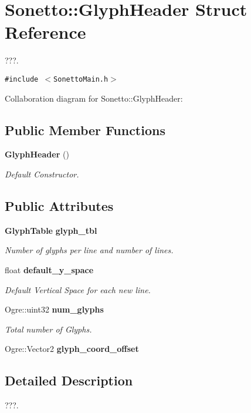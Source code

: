 \section{Sonetto::GlyphHeader Struct Reference}
\label{struct_sonetto_1_1_glyph_header}
???.  


{\tt \#include $<$SonettoMain.h$>$}

Collaboration diagram for Sonetto::GlyphHeader:\subsection*{Public Member Functions}
\begin{CompactItemize}
\item 
{\bf GlyphHeader} ()
\begin{CompactList}\small\item\em Default Constructor. \item\end{CompactList}\end{CompactItemize}
\subsection*{Public Attributes}
\begin{CompactItemize}
\item 
{\bf GlyphTable} {\bf glyph\_\-tbl}
\begin{CompactList}\small\item\em Number of glyphs per line and number of lines. \item\end{CompactList}\item 
float {\bf default\_\-y\_\-space}
\begin{CompactList}\small\item\em Default Vertical Space for each new line. \item\end{CompactList}\item 
Ogre::uint32 {\bf num\_\-glyphs}
\begin{CompactList}\small\item\em Total number of Glyphs. \item\end{CompactList}\item 
Ogre::Vector2 {\bf glyph\_\-coord\_\-offset}
\end{CompactItemize}


\subsection{Detailed Description}
???. 

